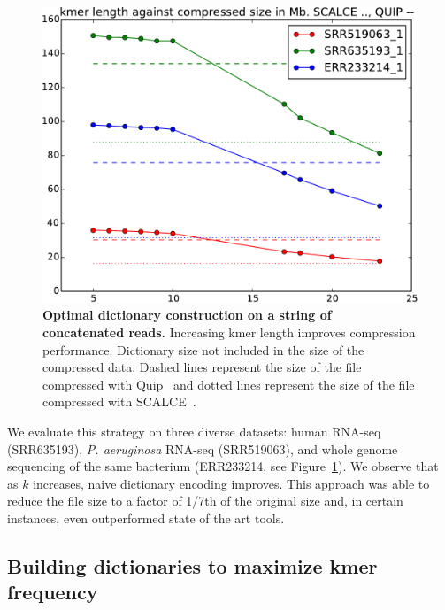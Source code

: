 \documentclass[12pt]{cmuthesis}
\begin{document}
  \begin{figure}[ht]
    \centering
    \includegraphics[width=0.7\linewidth]{figures/vary-k-fullfile-singleline}
    \caption{\textbf{Optimal dictionary construction on a string of concatenated reads.} Increasing kmer length improves compression performance. Dictionary size not included in the size of the compressed data. Dashed lines represent the size of the file compressed with Quip~\cite{Jones2012} and dotted lines represent the size of the file compressed with SCALCE~\cite{Sahinalp2012}.}
    \label{fig:denovocompr:varyK}
  \end{figure}

  We evaluate this strategy on three diverse datasets: human RNA-seq (SRR635193), \textit{P. aeruginosa} RNA-seq (SRR519063), and whole genome sequencing of the same bacterium (ERR233214, see Figure~\ref{fig:denovocompr:varyK}). We observe that as $k$ increases, naive dictionary encoding improves. This approach was able to reduce the file size to a factor of 1/7th of the original size and, in certain instances, even outperformed state of the art tools.


  \subsection{Building dictionaries to maximize kmer frequency}


\end{document}
